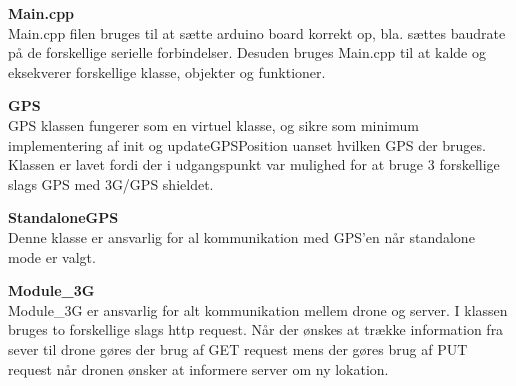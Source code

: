 \newpage

\textbf{Main.cpp} \\
Main.cpp filen bruges til at sætte arduino board korrekt op, bla. sættes baudrate på de forskellige serielle forbindelser. Desuden bruges Main.cpp til at kalde og eksekverer forskellige klasse, objekter og funktioner.

\textbf{GPS} \\
GPS klassen fungerer som en virtuel klasse, og sikre som minimum implementering af init og updateGPSPosition uanset hvilken GPS der bruges. Klassen er lavet fordi der i udgangspunkt var mulighed for at bruge 3 forskellige slags GPS med 3G/GPS shieldet. 

\textbf{StandaloneGPS}\\
Denne klasse er ansvarlig for al kommunikation med GPS'en når standalone mode er valgt. 

\textbf{Module\_3G} \\
Module\_3G er ansvarlig for alt kommunikation mellem drone og server. I klassen bruges to forskellige slags http request. Når der ønskes at trække information fra sever til drone gøres der brug af GET request mens der gøres brug af PUT request når dronen ønsker at informere server om ny lokation.

